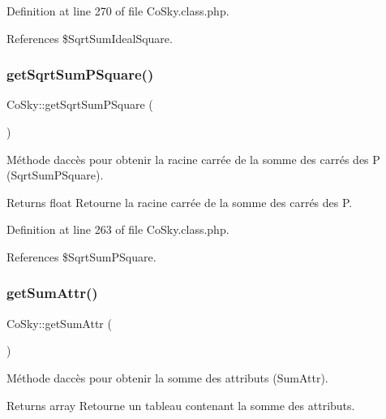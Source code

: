 Definition at line 270 of file Co\+Sky.\+class.\+php.



References \$\+Sqrt\+Sum\+Ideal\+Square.

\mbox{\label{class_co_sky_a7d42b59b979f2e143e80b5b4d22f16e7}} 
\subsubsection{\texorpdfstring{get\+Sqrt\+Sum\+P\+Square()}{getSqrtSumPSquare()}}
{\footnotesize\ttfamily Co\+Sky\+::get\+Sqrt\+Sum\+P\+Square (\begin{DoxyParamCaption}{ }\end{DoxyParamCaption})}

Méthode d\textquotesingle{}accès pour obtenir la racine carrée de la somme des carrés des P (Sqrt\+Sum\+P\+Square).

\begin{DoxyReturn}{Returns}
float Retourne la racine carrée de la somme des carrés des P. 
\end{DoxyReturn}


Definition at line 263 of file Co\+Sky.\+class.\+php.



References \$\+Sqrt\+Sum\+P\+Square.

\mbox{\label{class_co_sky_ad4699a3e8f4ceb13f09495a4faa0b3ed}} 
\subsubsection{\texorpdfstring{get\+Sum\+Attr()}{getSumAttr()}}
{\footnotesize\ttfamily Co\+Sky\+::get\+Sum\+Attr (\begin{DoxyParamCaption}{ }\end{DoxyParamCaption})}

Méthode d\textquotesingle{}accès pour obtenir la somme des attributs (Sum\+Attr).

\begin{DoxyReturn}{Returns}
array Retourne un tableau contenant la somme des attributs. 
\end{DoxyReturn}


